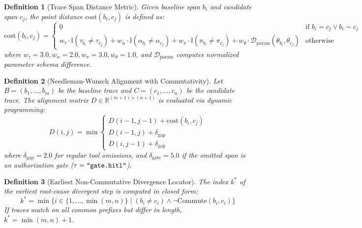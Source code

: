 \documentclass[11pt,a4paper]{article}
\newtheorem{definition}{Definition}
\begin{document}
\begin{definition}[Trace Span Distance Metric]
Given baseline span $b_i$ and candidate span $c_j$, the point distance $\text{cost}(b_i, c_j)$ is defined as:
\begin{equation}
\text{cost}(b_i, c_j) = \begin{cases}
0 & \text{if } b_i = c_j \lor b_i \sim c_j \\
w_\tau \cdot \mathbb{I}(\tau_{b_i} \neq \tau_{c_j}) + w_\alpha \cdot \mathbb{I}(\alpha_{b_i} \neq \alpha_{c_j}) + w_\pi \cdot \mathbb{I}(\pi_{b_i} \neq \pi_{c_j}) + w_\theta \cdot \mathcal{D}_{\text{param}}(\theta_{b_i}, \theta_{c_j}) & \text{otherwise}
\end{cases}
\end{equation}
where $w_\tau = 3.0, w_\alpha = 2.0, w_\pi = 3.0, w_\theta = 1.0$, and $\mathcal{D}_{\text{param}}$ computes normalized parameter schema difference.
\end{definition}

\begin{definition}[Needleman-Wunsch Alignment with Commutativity]
Let $B = (b_1, \dots, b_m)$ be the baseline trace and $C = (c_1, \dots, c_n)$ be the candidate trace. The alignment matrix $D \in \mathbb{R}^{(m+1) \times (n+1)}$ is evaluated via dynamic programming:
\begin{equation}
D(i, j) = \min \begin{cases}
D(i-1, j-1) + \text{cost}(b_i, c_j) \\
D(i-1, j) + \delta_{\text{gap}} \\
D(i, j-1) + \delta_{\text{gap}}
\end{cases}
\end{equation}
where $\delta_{\text{gap}} = 2.0$ for regular tool omissions, and $\delta_{\text{gate}} = 5.0$ if the omitted span is an authorization gate ($\tau = \text{\texttt{"gate.hitl"}}$).
\end{definition}

\begin{definition}[Earliest Non-Commutative Divergence Locator]
The index $k^*$ of the earliest root-cause divergent step is computed in closed form:
\begin{equation}
k^* = \min \{ i \in \{1, \dots, \min(m, n)\} \mid (b_i \neq c_i) \land \neg\text{Commute}(b_i, c_i) \}
\end{equation}
If traces match on all common prefixes but differ in length, $k^* = \min(m, n) + 1$.
\end{definition}
\end{document}
